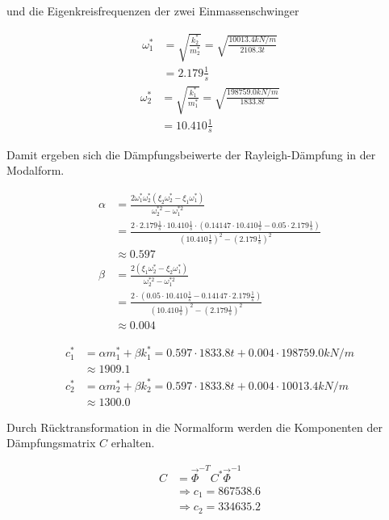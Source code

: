 und die Eigenkreisfrequenzen der zwei Einmassenschwinger

\begin{align*}
\omega_1^* &= \sqrt{\frac{k_2^*}{m_2^*}} = \sqrt{\frac{10013.4 kN/m}{2108.3 t}}\\
           &= 2.179 \frac{1}{s}
\end{align*}
\begin{align*}
\omega_2^* &= \sqrt{\frac{k_1^*}{m_1^*}} = \sqrt{\frac{198759.0 kN/m}{1833.8 t}}\\
           &= 10.410 \frac{1}{s}
\end{align*}

\pagebreak

Damit ergeben sich die Dämpfungsbeiwerte der Rayleigh-Dämpfung in der Modalform.

\begin{align*}
\alpha &= \frac{2 \omega_1^* \omega_2^* (\xi_2 \omega_2^* - \xi_1 \omega_1^*)}{\omega_2^{*2} - \omega_1^{*2}}\\
       &= \frac{2 \cdot 2.179 \frac{1}{s} \cdot 10.410 \frac{1}{s} \cdot (0.14147 \cdot 10.410 \frac{1}{s} - 0.05 \cdot 2.179 \frac{1}{s})}{(10.410 \frac{1}{s})^2 - (2.179 \frac{1}{s})^2}\\
       &\approx 0.597\\[2em]
\beta  &= \frac{2 (\xi_1 \omega_2^* - \xi_2 \omega_1^*)}{\omega_2^{*2} - \omega_1^{*2}}\\
       &= \frac{2 \cdot (0.05 \cdot 10.410 \frac{1}{s} - 0.14147 \cdot 2.179 \frac{1}{s})}{(10.410 \frac{1}{s})^2 - (2.179 \frac{1}{s})^2}\\
       &\approx 0.004
\end{align*}

\begin{align*}
c_1^* &= \alpha m_1^* + \beta k_1^* = 0.597 \cdot 1833.8 t + 0.004 \cdot 198759.0 kN/m\\
      &\approx 1909.1\\
c_2^* &= \alpha m_2^* + \beta k_2^* = 0.597 \cdot 1833.8 t + 0.004 \cdot 10013.4 kN/m\\
      &\approx 1300.0
\end{align*}

Durch Rücktransformation in die Normalform werden die Komponenten der Dämpfungsmatrix $C$ erhalten.

\begin{align*}
C &= \vec{\Phi}^{-T} C^* \vec{\Phi}^{-1}\\
  &\Rightarrow c_1 = 867538.6\\
  &\Rightarrow c_2 = 334635.2
\end{align*}

